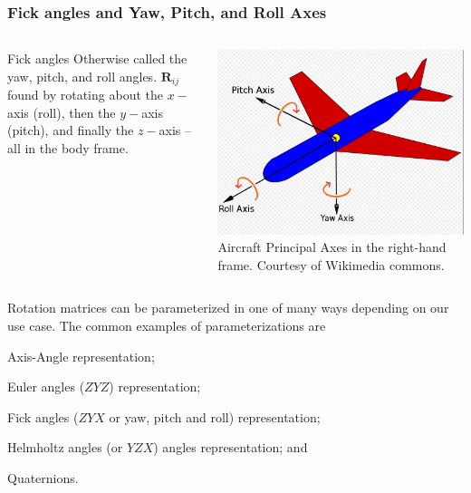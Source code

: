 \begin{frame}
	\frametitle{Fick angles and Yaw, Pitch, and Roll Axes}
	\begin{columns}[]
		\begin{column}{.45\linewidth}
			\begin{block}{Fick angles}
				Otherwise called the yaw, pitch, and roll angles. $\bm{R}_{ij}$ found by rotating about the $x-$axis  (roll), then the $y-$axis (pitch), and finally the $z-$axis -- all in the body frame. 
			\end{block}
		\end{column}
		\begin{column}{.55\linewidth}
			\centering
			\includegraphics[width=\textwidth]{figures/yawpitchroll.jpg}
			\footnotesize{Aircraft Principal Axes in the right-hand frame. Courtesy of Wikimedia commons.}
		\end{column}
	\end{columns}
\end{frame}

\begin{frame}
	\begin{tcolorbox}[title=Summary of Parameterizations]
		Rotation matrices can be parameterized in one of many ways depending on our use case. The common examples of parameterizations are 
		\begin{inparaenum} \newline
			\item Axis-Angle representation; \newline
			\item Euler  angles ($ZYZ$) representation; \newline
			\item Fick  angles (\ie $ZYX$ or yaw, pitch and roll)  representation; \newline
			\item Helmholtz angles (or $YZX$) angles representation; and \newline
			\item Quaternions.
		\end{inparaenum}
		
	\end{tcolorbox}
\end{frame}